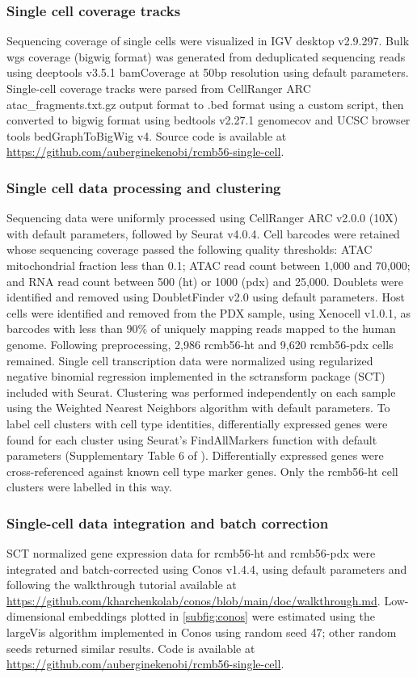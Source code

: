 \subsubsection{Single cell coverage tracks}
Sequencing coverage of single cells were visualized in IGV desktop v2.9.297. Bulk \acrshort{wgs} coverage (bigwig format) was generated from deduplicated sequencing reads using deeptools v3.5.1\cite{deeptools} bamCoverage at 50bp resolution using default parameters. Single-cell coverage tracks were parsed from CellRanger ARC atac\_fragments.txt.gz output format to .bed format using a custom script, then converted to bigwig format using bedtools v2.27.1\cite{bedtools} genomecov and UCSC browser tools\cite{ucsctools} bedGraphToBigWig v4. Source code is available at \url{https://github.com/auberginekenobi/rcmb56-single-cell}.
\subsubsection{Single cell data processing and clustering}
\label{methods:seurat}
Sequencing data were uniformly processed using CellRanger ARC v2.0.0 (10X) with default parameters, followed by Seurat v4.0.4\cite{seurat_4}. Cell barcodes were retained whose sequencing coverage passed the following quality thresholds: ATAC mitochondrial fraction less than 0.1; ATAC read count between 1,000 and 70,000; and RNA read count between 500 (ht) or 1000 (pdx) and 25,000. Doublets were identified and removed using DoubletFinder v2.0\cite{doubletfinder_2019} using default parameters. Host cells were identified and removed from the PDX sample, using Xenocell v1.0.1\cite{xenocell_2021}, as barcodes with less than 90\% of uniquely mapping reads mapped to the human genome. Following preprocessing, 2,986 \acrshort{rcmb56-ht} and 9,620 \acrshort{rcmb56-pdx} cells remained. Single cell transcription data were normalized using regularized negative binomial regression implemented in the sctransform package\cite{sctransform_2019} (SCT) included with Seurat.
Clustering was performed independently on each sample using the Weighted Nearest Neighbors algorithm\cite{seurat_4} with default parameters. To label cell clusters with cell type identities, differentially expressed genes were found for each cluster using Seurat's FindAllMarkers function with default parameters (Supplementary Table 6 of \cite{Chapman}). Differentially expressed genes were cross-referenced against known cell type marker genes\cite{Karlsson_2021}. Only the \acrshort{rcmb56-ht} cell clusters were labelled in this way.
\subsubsection{Single-cell data integration and batch correction}
SCT normalized gene expression data for \acrshort{rcmb56-ht} and \acrshort{rcmb56-pdx} were integrated and batch-corrected using Conos v1.4.4\cite{conos_2019}, using default parameters and following the walkthrough tutorial available at \url{https://github.com/kharchenkolab/conos/blob/main/doc/walkthrough.md}. Low-dimensional embeddings plotted in \ref{subfig:conos} were estimated using the largeVis algorithm implemented in Conos using random seed 47; other random seeds returned similar results. Code is available at \url{https://github.com/auberginekenobi/rcmb56-single-cell}.

